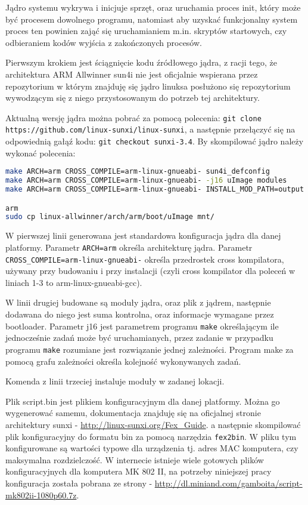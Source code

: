 Jądro systemu wykrywa i inicjuje sprzęt, oraz uruchamia proces init, który może być procesem dowolnego programu, natomiast aby uzyskać funkcjonalny system proces ten powinien zająć się uruchamianiem m.in. skryptów startowych, czy odbieraniem kodów wyjścia z zakończonych procesów.

Pierwszym krokiem jest ściągnięcie kodu źródłowego jądra, z racji tego, że architektura ARM Allwinner sun4i nie jest oficjalnie wspierana przez repozytorium w którym znajduję się jądro linuksa posłużono się repozytorium wywodzącym się z niego przystosowanym do potrzeb tej architektury.

Aktualną wersję jądra można pobrać za pomocą polecenia: \lstinline{git clone https://github.com/linux-sunxi/linux-sunxi}, a następnie przełączyć się na odpowiednią gałąź kodu: \lstinline{git checkout sunxi-3.4}. By skompilować jądro należy wykonać polecenia:

\begin{lstlisting}[language=bash]
make ARCH=arm CROSS_COMPILE=arm-linux-gnueabi- sun4i_defconfig
make ARCH=arm CROSS_COMPILE=arm-linux-gnueabi- -j16 uImage modules
make ARCH=arm CROSS_COMPILE=arm-linux-gnueabi- INSTALL_MOD_PATH=output modules_install

arm
sudo cp linux-allwinner/arch/arm/boot/uImage mnt/
\end{lstlisting}

W pierwszej linii generowana jest standardowa konfiguracja jądra dla danej platformy. Parametr \lstinline{ARCH=arm} określa architekturę jądra. Parametr \lstinline{CROSS_COMPILE=arm-linux-gnueabi-} określa przedrostek cross kompilatora, używany przy budowaniu i przy instalacji (czyli cross kompilator dla poleceń w liniach 1-3 to arm-linux-gnueabi-gcc).

\par

W linii drugiej budowane są moduły jądra, oraz plik z jądrem, następnie dodawana do niego jest suma kontrolna, oraz informacje wymagane przez bootloader. Parametr j16 jest parametrem programu \lstinline{make} określającym ile jednocześnie zadań może być uruchamianych, przez zadanie w przypadku programu \lstinline{make} rozumiane jest rozwiązanie jednej zależności. Program make za pomocą grafu zależności określa kolejność wykonywanych zadań.

\par
Komenda z linii trzeciej instaluje moduły w zadanej lokacji.
\par
Plik script.bin jest plikiem konfiguracyjnym dla danej platformy. Można go wygenerować samemu, dokumentacja znajduję się na oficjalnej stronie architektury sunxi - \url{http://linux-sunxi.org/Fex_Guide}. a następnie skompilować plik konfiguracyjny do formatu bin za pomocą narzędzia \lstinline{fex2bin}. W pliku tym konfigurowane są wartości typowe dla urządzenia tj. adres MAC komputera, czy maksymalna rozdzielczość.  W internecie istnieje wiele gotowych plików konfiguracyjnych dla komputera MK 802 II, na potrzeby niniejszej pracy konfiguracja została pobrana ze strony - \url{http://dl.miniand.com/gamboita/script-mk802ii-1080p60.7z}. 

